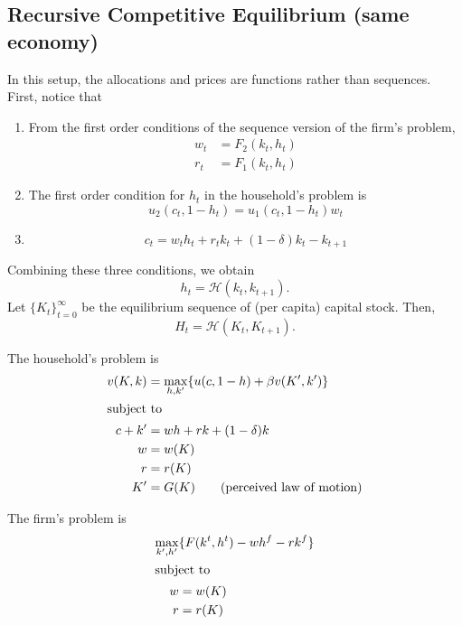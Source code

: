 \documentclass[11pt]{article}
\begin{document}
\subsection{Recursive Competitive Equilibrium (same economy)}
\label{sec:orgb8b90cf}
In this setup, the allocations and prices are functions rather than sequences. First, notice that
\begin{enumerate}
\item From the first order conditions of the sequence version of the firm's problem,
\begin{align*}
w_t &= F_2(k_t, h_t)\\
r_t &= F_1(k_t, h_t)
\end{align*}
\item The first order condition for $h_t$ in the household's problem is
\[
u_2(c_t, 1 - h_t) = u_1(c_t, 1 - h_t)w_t
\]
\item
\[
c_t = w_t h_t + r_t k_t + (1 - \delta)k_t - k_{t + 1}
\]
\end{enumerate}
Combining these three conditions, we obtain
\[
h_t = \mathcal{H}(k_t, k_{t + 1}).
\]
Let \(\{K_t\}^\infty_{t = 0}\) be the equilibrium sequence of (per capita) capital stock. Then,
\[
H_t = \mathcal{H} (K_t, K_{t + 1}).
\]

The household's problem is
\begin{align*}
v(K, k) &= \max_{h, k'} \{u(c, 1 - h) + \beta v(K', k')\}\\
\intertext{subject to}
c + k' &= wh + rk + (1 - \delta)k\\
w &= w(K)\\
r &= r(K)\\
K' &= G(K) \tag{perceived law of motion}
\end{align*}

The firm's problem is
\begin{align*}
\max_{k', h'} &\{F(k^t, h^t) - wh^f - rk^f\}\\
\intertext{subject to}
w &= w(K)\\
r &= r(K)
\end{align*}
\end{document}
